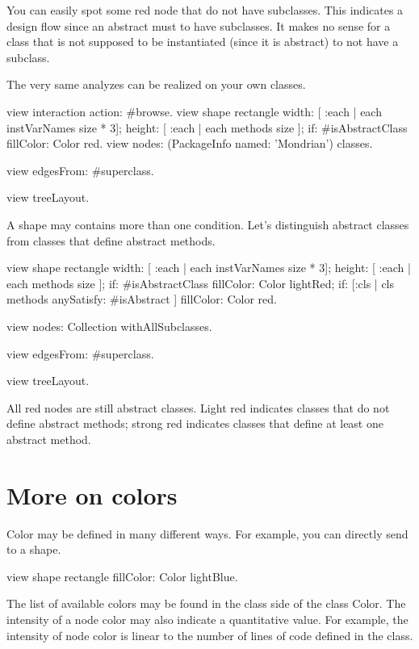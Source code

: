 \documentclass[a4paper,10pt,twoside]{book}
\begin{document}
You can easily spot some red node that do not have subclasses. This indicates a design flow since an abstract must to have subclasses. It makes no sense for a class that is not supposed to be instantiated (since it is abstract) to not have a subclass.

The very same analyzes can be realized on your own classes.

\begin{code}{}
view interaction action: #browse.
view shape rectangle
  width: [ :each | each instVarNames size * 3];
  height: [ :each | each methods size ];
  if: #isAbstractClass fillColor: Color red.
view nodes: (PackageInfo named: 'Mondrian') classes.

view edgesFrom: #superclass.

view treeLayout.
\end{code}

A shape may contains more than one condition. Let's distinguish abstract classes from classes that define abstract methods.

\begin{code}{}
view shape rectangle
  width: [ :each | each instVarNames size * 3];
  height: [ :each | each methods size ];
  if: #isAbstractClass fillColor: Color lightRed;
  if: [:cls | cls methods anySatisfy: #isAbstract ] fillColor: Color red.

view nodes: Collection withAllSubclasses.

view edgesFrom: #superclass.

view treeLayout.
\end{code}

All red nodes are still abstract classes. Light red indicates classes that do not define abstract methods; strong red indicates classes that define at least one abstract method.

\section{More on colors}
Color may be defined in many different ways. For example, you can directly send  to a shape.

\begin{code}{}
view shape rectangle
  fillColor: Color lightBlue.
\end{code}

The list of available colors may be found in the class side of the class Color. The intensity of a node color may also indicate a quantitative value. For example, the intensity of node color is linear to the number of lines of code defined in the class.
\end{document}
